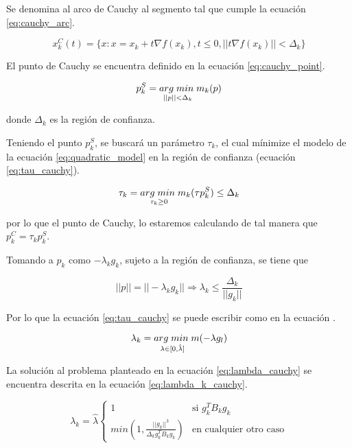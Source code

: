 Se denomina al arco de Cauchy al segmento tal que cumple la ecuación \ref{eq:cauchy_arc}.

\begin{equation}
    x_k^C(t) = \{x: x=x_k + t\nabla f(x_k), t\leq 0, ||t\nabla f(x_k)|| < \Delta_k \}
    \label{eq:cauchy_arc}
\end{equation}

El punto de Cauchy se encuentra definido en la ecuación \ref{eq:cauchy_point}.

\begin{equation}
    p_k^S = \underset{||p||<\Delta_k}{arg\; min\;} m_k(p) \label{eq:cauchy_point}
\end{equation}

donde $\Delta_k$ es la región de confianza.

Teniendo el punto $p_k^S$, se buscará un parámetro $\tau_k$, el cual mínimize el modelo de la ecuación \ref*{eq:quadratic_model} en la región de confianza (ecuación \ref{eq:tau_cauchy}).

\begin{equation}
    \tau_k = \underset{\tau_k \geq 0}{arg\; min\;} m_k(\tau p_k^S) \leq \Delta_k \label{eq:tau_cauchy}
\end{equation}

por lo que el punto de Cauchy, lo estaremos calculando de tal manera que $p_k^C = \tau_k p_k^S$.

Tomando a $p_k$ como $-\lambda_k g_k$, sujeto a la región de confianza, se tiene que

\begin{equation*}
    ||p|| = ||-\lambda_k g_k|| \Rightarrow \lambda_k \leq \frac{\Delta_k}{||g_k||}
\end{equation*}


Por lo que la ecuación \ref{eq:tau_cauchy} se puede escribir como en la ecuación .

\begin{equation}
    \lambda_k = \underset{\lambda \in [0,\hat{\lambda}]}{arg\; min\;}  m(-\lambda g_l) \label{eq:lambda_cauchy}
\end{equation}

La solución al problema planteado en la ecuación \ref{eq:lambda_cauchy} se encuentra descrita en la ecuación \ref{eq:lambda_k_cauchy}.

\begin{equation}
    \lambda_k = \hat{\lambda} \left\{\begin{matrix}
        1                                                            & \text{si } g^T_k B_k g_k      \\
        min\left(1, \frac{||g_k||^3}{\Delta_k g_k^T B_k g_k} \right) & \text{en cualquier otro caso}
    \end{matrix}\right. \label{eq:lambda_k_cauchy}
\end{equation}

